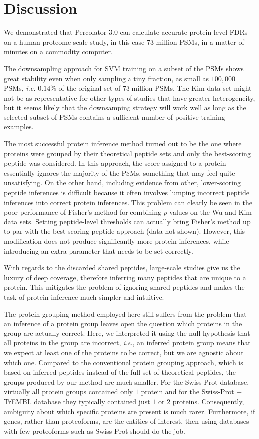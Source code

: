 \documentclass{article}
\begin{document}
\section*{Discussion}

We demonstrated that Percolator 3.0 can calculate accurate
protein-level FDRs on a human proteome-scale study, in this case $73$
million PSMs, in a matter of minutes on a commodity computer.

The downsampling approach for SVM training on a subset of the PSMs 
shows great stability even when only sampling a tiny fraction, as 
small as $100,000$ PSMs, {\em i.e.} $0.14\%$ of the original set of 
$73$ million PSMs.  The Kim data set might not be as representative 
for other types of studies that have greater heterogeneity, but it 
seems likely that the downsamping strategy will work well as long as 
the selected subset of PSMs contains a sufficient number of positive 
training examples.

The most successful protein inference method turned out to be the one
where proteins were grouped by their theoretical peptide sets and only
the best-scoring peptide was considered. In this approach, the score
assigned to a protein essentially ignores the majority of the PSMs,
something that may feel quite unsatisfying. On the other hand,
including evidence from other, lower-scoring peptide inferences is
difficult because it often involves lumping incorrect peptide
inferences into correct protein inferences.  This problem can clearly
be seen in the poor performance of Fisher's method for combining $p$
values on the Wu and Kim data sets. Setting peptide-level thresholds
can actually bring Fisher's method up to par with the best-scoring
peptide approach (data not shown). However, this modification does not
produce significantly more protein inferences, while introducing an
extra parameter that needs to be set correctly.

With regards to the discarded shared peptides, large-scale studies
give us the luxury of deep coverage, therefore inferring many
peptides that are unique to a protein. This mitigates the problem of
ignoring shared peptides and makes the task of protein inference much
simpler and intuitive.

The protein grouping method employed here still suffers from the 
problem that an inference of a protein group leaves open the question 
which proteins in the group are actually correct. Here, we interpreted 
it using the null hypothesis that all proteins in the group are 
incorrect, {\em i.e.}, an inferred protein group means that we expect 
at least one of the proteins to be correct, but we are agnostic about 
which one. Compared to the conventional protein grouping approach, 
which is based on inferred peptides instead of the full set of 
theoretical peptides, the groups produced by our method are much 
smaller. For the Swiss-Prot database, virtually all protein groups 
contained only $1$ protein and for the Swiss-Prot + TrEMBL database 
they typically contained just $1$ or $2$ proteins. Consequently, 
ambiguity about which specific proteins are present is much rarer.  
Furthermore, if genes, rather than proteoforms, are the entities of 
interest, then using databases with few proteoforms such as Swiss-Prot 
should do the job.
\end{document}

